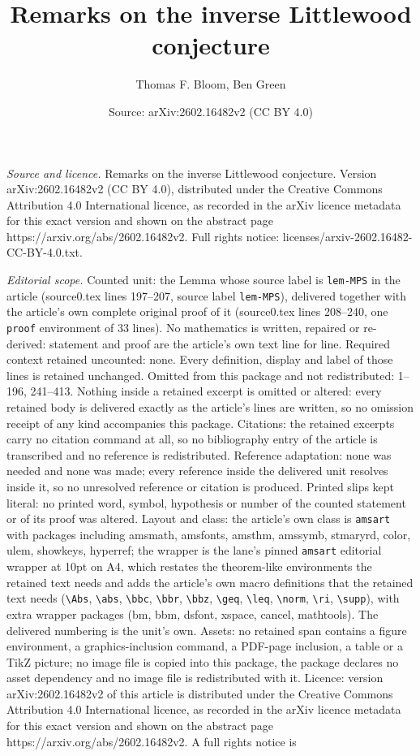 \documentclass[10pt,a4paper]{amsart}
\title[Remarks on the inverse Littlewood conjecture]{Remarks on the inverse Littlewood conjecture}
\author{Thomas F. Bloom, Ben Green}
\date{Source: arXiv:2602.16482v2 (CC BY 4.0)}
\begin{document}
\maketitle

\noindent\emph{Source and licence.} Remarks on the inverse Littlewood conjecture. Version arXiv:2602.16482v2 (CC BY 4.0), distributed under the Creative Commons Attribution 4.0 International licence, as recorded in the arXiv licence metadata for this exact version and shown on the abstract page https://arxiv.org/abs/2602.16482v2. Full rights notice: licenses/arxiv-2602.16482-CC-BY-4.0.txt.\par\smallskip

\noindent\textit{Editorial scope.} Counted unit: the Lemma whose source label is \texttt{lem-MPS} in the article (source0.tex lines 197--207, source label \texttt{lem-MPS}), delivered together with the article's own complete original proof of it (source0.tex lines 208--240, one \texttt{proof} environment of 33 lines). No mathematics is written, repaired or re-derived: statement and proof are the article's own text line for line. Required context retained uncounted: none. Every definition, display and label of those lines is retained unchanged. Omitted from this package and not redistributed: 1--196, 241--413. Nothing inside a retained excerpt is omitted or altered: every retained body is delivered exactly as the article's lines are written, so no omission receipt of any kind accompanies this package. Citations: the retained excerpts carry no citation command at all, so no bibliography entry of the article is transcribed and no reference is redistributed. Reference adaptation: none was needed and none was made; every reference inside the delivered unit resolves inside it, so no unresolved reference or citation is produced. Printed slips kept literal: no printed word, symbol, hypothesis or number of the counted statement or of its proof was altered. Layout and class: the article's own class is \texttt{amsart} with packages including amsmath, amsfonts, amsthm, amssymb, stmaryrd, color, ulem, showkeys, hyperref; the wrapper is the lane's pinned \texttt{amsart} editorial wrapper at 10pt on A4, which restates the theorem-like environments the retained text needs and adds the article's own macro definitions that the retained text needs (\texttt{\textbackslash Abs}, \texttt{\textbackslash abs}, \texttt{\textbackslash bbc}, \texttt{\textbackslash bbr}, \texttt{\textbackslash bbz}, \texttt{\textbackslash geq}, \texttt{\textbackslash leq}, \texttt{\textbackslash norm}, \texttt{\textbackslash ri}, \texttt{\textbackslash supp}), with extra wrapper packages (bm, bbm, dsfont, xspace, cancel, mathtools). The delivered numbering is the unit's own. Assets: no retained span contains a figure environment, a graphics-inclusion command, a PDF-page inclusion, a table or a TikZ picture; no image file is copied into this package, the package declares no asset dependency and no image file is redistributed with it. Licence: version arXiv:2602.16482v2 of this article is distributed under the Creative Commons Attribution 4.0 International licence, as recorded in the arXiv licence metadata for this exact version and shown on the abstract page https://arxiv.org/abs/2602.16482v2. A full rights notice is 
\end{document}
